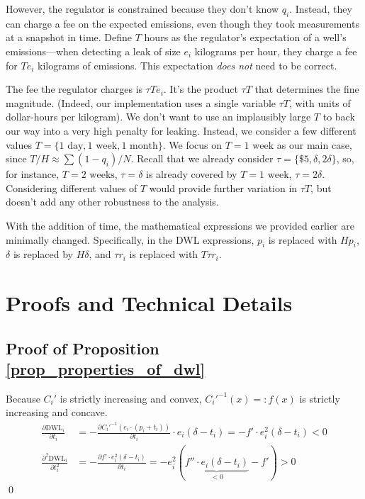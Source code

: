 \documentclass[12pt,oneside,letterpaper]{article}
\newlength{\premathenv}
\newlength{\postmathenv}
\theoremstyle{definition}
\renewenvironment{proof}{%
\vspace{\premathenv}%
\noindent{\textit{Proof:} }
}{%
\qed
\vspace{\postmathenv}%
}
\begin{document}
\begin{refsection}
However, the regulator is constrained because they don't know \(q_i\).
Instead, they can charge a fee on the expected emissions, even though they took measurements at a snapshot in time.
Define \(T\) hours as the regulator's expectation of a well's emissions---when detecting a leak of size \(e_i\) kilograms per hour, they charge a fee for \(T e_i\) kilograms of emissions.
This expectation \emph{does not} need to be correct.

The fee the regulator charges is \(\tau T e_i\).
It's the product \(\tau T\) that determines the fine magnitude.
(Indeed, our implementation uses a single variable \(\tau T\), with units of dollar-hours per kilogram).
We don't want to use an implausibly large \(T\) to back our way into a very high penalty for leaking.
Instead, we consider a few different values \(T = \{\text{1 day}, \text{1 week}, \text{1 month}\}\).
We focus on \(T = \text{1 week}\) as our main case, since \(T / H \approx \sum (1 - q_i) / N\).
Recall that we already consider
\(\tau = \{\$5, \delta, 2 \delta\}\),
so, for instance, \(T = \text{2 weeks}\), \(\tau = \delta\) is already covered by \(T = \text{1 week}\), \(\tau = 2\delta\).
Considering different values of \(T\) would provide further variation in \(\tau T\), but doesn't add any other robustness to the analysis.

With the addition of time, the mathematical expressions we provided earlier are minimally changed.
Specifically, in the \gls{DWL} expressions, \(p_i\) is replaced with \(H p_i\),
\(\delta\) is replaced by \(H \delta\),
and \(\tau r_i\) is replaced with \(T \tau r_i\).

\section{Proofs and Technical Details}
\label{app:proofs}

\subsection{Proof of Proposition \autoref{prop_properties_of_dwl}}
\label{app:proofs-well-operator}
\begin{proof}
Because $C_i'$ is strictly increasing and convex, $C_i'^{-1}(x) =: f(x)$ is strictly increasing and concave.
\begin{align*}
\frac{\partial \text{DWL}_i}{\partial t_i} &= - \frac{\partial {C_i'}^{-1}(e_i \cdot (p_i + t_i))}{\partial t_i} \cdot e_i (\delta - t_i) = - f' \cdot e_i^2 (\delta - t_i) < 0\\
\frac{\partial^2 \text{DWL}_i}{\partial t^2_i} &= - \frac{\partial f' \cdot e_i^2 (\delta - t_i)}{\partial t_i} = -e_i^2(\underbrace{f'' \cdot e_i(\delta - t_i)}_{<0} - f') > 0
\end{align*}
\end{proof}



\end{refsection}
\end{document}
